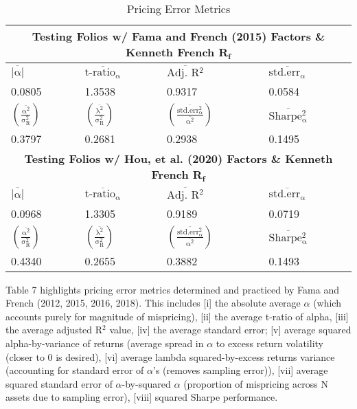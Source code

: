 \documentclass[11pt, english]{article}
\begin{document}
\begin{table}[h]
	\scriptsize
	\renewcommand{\arraystretch}{1.25}
\begin{center}
\begin{tabular}{ p{2cm} p{2cm} p{2cm} p{2cm} }
        \hline
        \hline
        \multicolumn{4}{c}{\textbf{Testing Folios w/ Fama and French (2015) Factors \& Kenneth French R$\mathbf{_f}$}}\\
        \hline
        \hline
        $\mathrm{\overline{|\alpha|}}$ & $\mathrm{\overline{\textrm{t-ratio}_{\alpha}}}$ & $\overline{\textrm{Adj. R}\mathrm{^2}}$ & $\overline{\mathrm{std.err_{\alpha}}}$\\
        \hline
        0.0805 & 1.3538 & 0.9317 & 0.0584\\
        \hline
	$\mathrm{\left(\frac{\overline{\alpha^2}}{\sigma_R^2}\right)}$ & $\mathrm{\left(\frac{\overline{\lambda^2}}{\sigma_R^2}\right)}$ & $\mathrm{\left(\frac{\overline{std.err_{\alpha}^2}}{\overline{\alpha^2}}\right)}$ & $\overline{\mathrm{Sharpe_{\alpha}^2}}$\\ 
        \hline
        0.3797 & 0.2681 & 0.2938 & 0.1495\\
        \hline
        \hline
        \multicolumn{4}{c}{\textbf{Testing Folios w/ Hou, et al. (2020) Factors \& Kenneth French R$\mathbf{_f}$}}\\
        \hline
        \hline
        $\mathrm{\overline{|\alpha|}}$ & $\mathrm{\overline{\textrm{t-ratio}_{\alpha}}}$ & $\overline{\textrm{Adj. R}\mathrm{^2}}$ & $\overline{\mathrm{std.err_{\alpha}}}$\\   
        \hline
        0.0968 & 1.3305 & 0.9189 & 0.0719\\
        \hline
	$\mathrm{\left(\frac{\overline{\alpha^2}}{\sigma_R^2}\right)}$ & $\mathrm{\left(\frac{\overline{\lambda^2}}{\sigma_R^2}\right)}$ & $\mathrm{\left(\frac{\overline{std.err_{\alpha}^2}}{\overline{\alpha^2}}\right)}$ & $\overline{\mathrm{Sharpe_{\alpha}^2}}$\\
        \hline
        0.4340 & 0.2655 & 0.3882 & 0.1493\\
        \hline
\end{tabular}
        \caption{Pricing Error Metrics}
\end{center}
\end{table}

Table 7 highlights pricing error metrics determined and practiced by Fama and French (2012, 2015, 2016, 2018). This includes [i] the absolute average $\alpha$ (which accounts purely for magnitude of mispricing), [ii] the average t-ratio of alpha, [iii] the average adjusted R$^2$ value, [iv] the average standard error; [v] average squared alpha-by-variance of returns (average spread in $\alpha$ to excess return volatility (closer to 0 is desired), [vi] average lambda squared-by-excess returns variance (accounting for standard error of $\alpha$'s (removes sampling error)), [vii] average squared standard error of $\alpha$-by-squared $\alpha$ (proportion of mispricing across N assets due to sampling error), [viii] squared Sharpe performance. 
\end{document}
